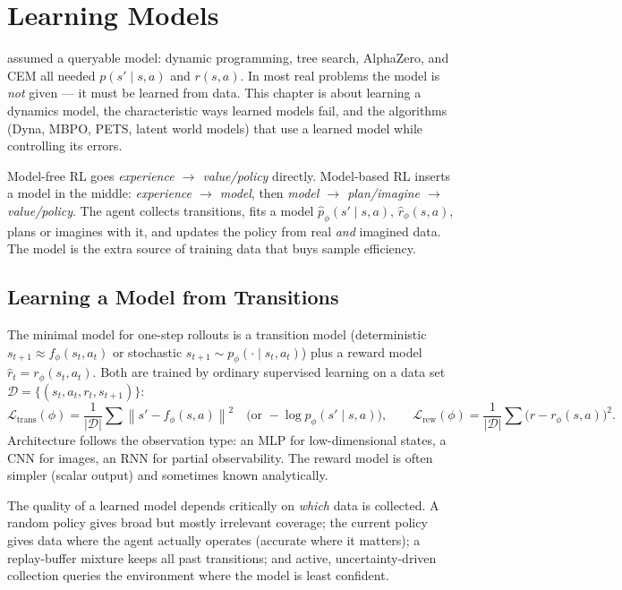 \documentclass[11pt, oneside]{book}
\newcommand{\norm}[1]{\left\lVert #1 \right\rVert}
\newcommand{\abs}[1]{\left\lvert #1 \right\rvert}
\newcommand{\loss}{\mathcal{L}}          %
\newcommand{\dataset}{\mathcal{D}}       %
\newcommand{\params}{\boldsymbol{\theta}}   %
\begin{document}
\chapter{Learning Models}
\label{chap:mbrl}

 assumed a queryable model: dynamic programming, tree search,
AlphaZero, and CEM all needed $p(s'\mid s,a)$ and $r(s,a)$. In most real problems the
model is \emph{not} given --- it must be learned from data. This chapter is about
learning a dynamics model, the characteristic ways learned models fail, and the
algorithms (Dyna, MBPO, PETS, latent world models) that use a learned model while
controlling its errors.

\begin{intbox}[title={The model-based RL loop}]
Model-free RL goes \emph{experience $\to$ value/policy} directly. Model-based RL inserts
a model in the middle: \emph{experience $\to$ model}, then \emph{model $\to$ plan/imagine
$\to$ value/policy}. The agent collects transitions, fits a model
$\hat p_\phi(s'\mid s,a),\, \hat r_\phi(s,a)$, plans or imagines with it, and updates the
policy from real \emph{and} imagined data. The model is the extra source of training data
that buys sample efficiency.
\end{intbox}

\section{Learning a Model from Transitions}

The minimal model for one-step rollouts is a transition model (deterministic
$s_{t+1}\approx f_\phi(s_t,a_t)$ or stochastic $s_{t+1}\sim p_\phi(\cdot\mid s_t,a_t)$)
plus a reward model $\hat r_t = r_\phi(s_t,a_t)$. Both are trained by ordinary supervised
learning on a data set $\dataset = \{(s_t,a_t,r_t,s_{t+1})\}$:
\[
  \loss_{\text{trans}}(\phi) = \frac{1}{\abs{\dataset}}\sum \norm{s' - f_\phi(s,a)}^2
  \quad\text{(or }-\log p_\phi(s'\mid s,a)\text{)},
  \qquad
  \loss_{\text{rew}}(\phi) = \frac{1}{\abs{\dataset}}\sum \bigl(r - r_\phi(s,a)\bigr)^2.
\]
Architecture follows the observation type: an MLP for low-dimensional states, a CNN for
images, an RNN for partial observability. The reward model is often simpler (scalar
output) and sometimes known analytically.

The quality of a learned model depends critically on \emph{which} data is collected. A
random policy gives broad but mostly irrelevant coverage; the current policy gives data
where the agent actually operates (accurate where it matters); a replay-buffer mixture
keeps all past transitions; and active, uncertainty-driven collection queries the
environment where the model is least confident.
\end{document}
